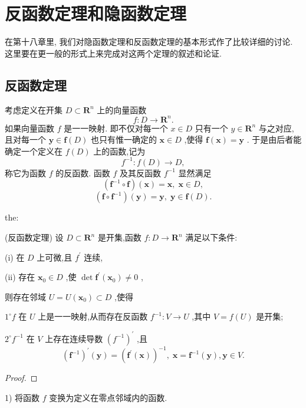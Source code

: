 \section{反函数定理和隐函数定理}

在第十八章里, 我们对隐函数定理和反函数定理的基本形式作了比较详细的讨论. 这里要在更一般的形式上来完成对这两个定理的叙述和论证.

\subsection{反函数定理}

考虑定义在开集 \(D \subset  {\mathbf{R}}^{n}\) 上的向量函数
\[
f : D \rightarrow  {\mathbf{R}}^{n}.
\]
如果向量函数 \(f\) 是一一映射. 即不仅对每一个 \(x \in  D\) 只有一个 \(y \in  {\mathbf{R}}^{n}\) 与之对应,且对每一个 \(\mathbf{y} \in  \mathbf{f}\left( D\right)\) 也只有惟一确定的 \(\mathbf{x} \in  D\) ,使得 \(\mathbf{f}\left( \mathbf{x}\right)  = \mathbf{y}\) . 于是由后者能确定一个定义在 \(f\left( D\right)\) 上的函数,记为
\[
{f}^{-1} : f\left( D\right)  \rightarrow  D,
\]
称它为函数 \(f\) 的反函数. 函数 \(f\) 及其反函数 \({f}^{-1}\) 显然满足
\[
\left( {{\mathbf{f}}^{-1} \circ  \mathbf{f}}\right) \left( \mathbf{x}\right)  = \mathbf{x},\;\mathbf{x} \in  D, \tag{1}
\]
\[
\left( {\mathbf{f} \circ  {\mathbf{f}}^{-1}}\right) \left( \mathbf{y}\right)  = \mathbf{y},\;\mathbf{y} \in  \mathbf{f}\left( D\right) . \tag{2}
\]
\begin{theorem}{}{the:}

\end{theorem}
 (反函数定理) 设 \(D \subset  {\mathbf{R}}^{n}\) 是开集,函数 \(f : D \rightarrow  {\mathbf{R}}^{n}\) 满足以下条件:

(i) 在 \(D\) 上可微,且 \({f}^{\prime }\) 连续,

(ii) 存在 \({\mathbf{x}}_{0} \in  D\) ,使 \(\det {\mathbf{f}}^{\prime }\left( {\mathbf{x}}_{0}\right)  \neq  0\) ,

则存在邻域 \(U = U\left( {\mathbf{x}}_{0}\right)  \subset  D\) ,使得

\({1}^{ \circ  }f\) 在 \(U\) 上是一一映射,从而存在反函数 \({f}^{-1} : V \rightarrow  U\) ,其中 \(V = f\left( U\right)\) 是开集;

\({2}^{ \circ  }{f}^{-1}\) 在 \(V\) 上存在连续导数 \({\left( {f}^{-1}\right) }^{\prime }\) ,且
\[
{\left( {\mathbf{f}}^{-1}\right) }^{\prime }\left( \mathbf{y}\right)  = {\left( {\mathbf{f}}^{\prime }\left( \mathbf{x}\right) \right) }^{-1},\;\mathbf{x} = {\mathbf{f}}^{-1}\left( \mathbf{y}\right) ,\mathbf{y} \in  V. \tag{3}
\]
\begin{proof}

\end{proof}
1) 将函数 \(f\) 变换为定义在零点邻域内的函数.

